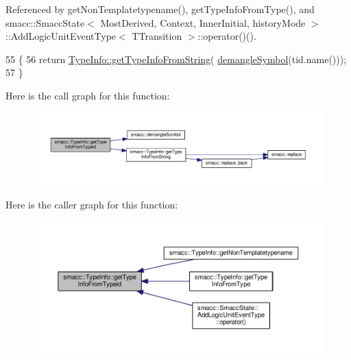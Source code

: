 Referenced by get\+Non\+Templatetypename(), get\+Type\+Info\+From\+Type(), and smacc\+::\+Smacc\+State$<$ Most\+Derived, Context, Inner\+Initial, history\+Mode $>$\+::\+Add\+Logic\+Unit\+Event\+Type$<$ T\+Transition $>$\+::operator()().


\begin{DoxyCode}
55 \{
56     \textcolor{keywordflow}{return} \hyperlink{classsmacc_1_1TypeInfo_a9bff1505e37e69b869d686a30c507033}{TypeInfo::getTypeInfoFromString}(
      \hyperlink{namespacesmacc_a458f5e70d468824fbcd66cc7729deaa8}{demangleSymbol}(tid.name()));
57 \}
\end{DoxyCode}


Here is the call graph for this function\+:
\nopagebreak
\begin{figure}[H]
\begin{center}
\leavevmode
\includegraphics[width=350pt]{classsmacc_1_1TypeInfo_a9d871ecc7a19983b37afca0cd219a5f8_cgraph}
\end{center}
\end{figure}




Here is the caller graph for this function\+:
\nopagebreak
\begin{figure}[H]
\begin{center}
\leavevmode
\includegraphics[width=350pt]{classsmacc_1_1TypeInfo_a9d871ecc7a19983b37afca0cd219a5f8_icgraph}
\end{center}
\end{figure}


